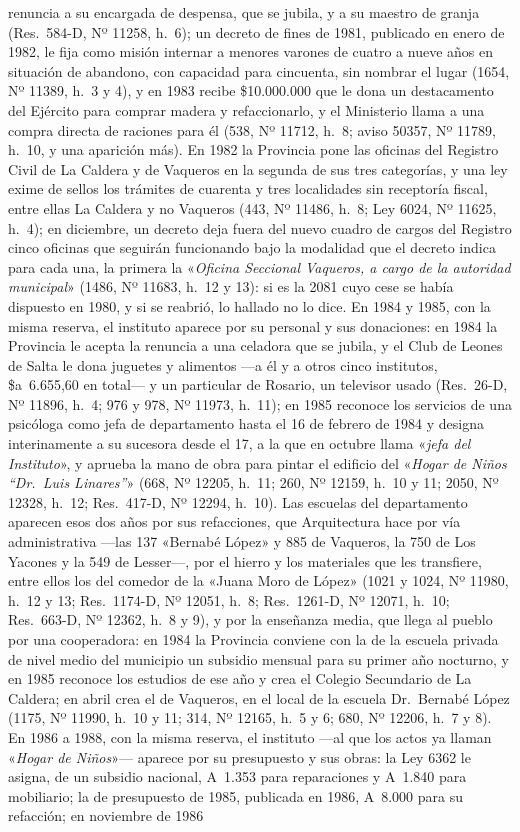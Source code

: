 renuncia a su encargada de despensa, que se jubila, y a su maestro de granja (Res.\ 584-D, Nº 11258, h.\ 6); un decreto de fines de 1981, publicado en enero de 1982, le fija como misión internar a menores varones de cuatro a nueve años en situación de abandono, con capacidad para cincuenta, sin nombrar el lugar (1654, Nº 11389, h.\ 3 y 4), y en 1983 recibe \$10.000.000 que le dona un destacamento del Ejército para comprar madera y refaccionarlo, y el Ministerio llama a una compra directa de raciones para él (538, Nº 11712, h.\ 8; aviso 50357, Nº 11789, h.\ 10, y una aparición más). En 1982 la Provincia pone las oficinas del Registro Civil de La Caldera y de Vaqueros en la segunda de sus tres categorías, y una ley exime de sellos los trámites de cuarenta y tres localidades sin receptoría fiscal, entre ellas La Caldera y no Vaqueros (443, Nº 11486, h.\ 8; Ley 6024, Nº 11625, h.\ 4); en diciembre, un decreto deja fuera del nuevo cuadro de cargos del Registro cinco oficinas que seguirán funcionando bajo la modalidad que el decreto indica para cada una, la primera la «\textit{Oficina Seccional Vaqueros, a cargo de la autoridad municipal}» (1486, Nº 11683, h.\ 12 y 13): si es la 2081 cuyo cese se había dispuesto en 1980, y si se reabrió, lo hallado no lo dice. En 1984 y 1985, con la misma reserva, el instituto aparece por su personal y sus donaciones: en 1984 la Provincia le acepta la renuncia a una celadora que se jubila, y el Club de Leones de Salta le dona juguetes y alimentos ---a él y a otros cinco institutos, \$a~6.655,60 en total--- y un particular de Rosario, un televisor usado (Res.\ 26-D, Nº 11896, h.\ 4; 976 y 978, Nº 11973, h.\ 11); en 1985 reconoce los servicios de una psicóloga como jefa de departamento hasta el 16 de febrero de 1984 y designa interinamente a su sucesora desde el 17, a la que en octubre llama «\textit{jefa del Instituto}», y aprueba la mano de obra para pintar el edificio del «\textit{Hogar de Niños ``Dr.\ Luis Linares''}» (668, Nº 12205, h.\ 11; 260, Nº 12159, h.\ 10 y 11; 2050, Nº 12328, h.\ 12; Res.\ 417-D, Nº 12294, h.\ 10). Las escuelas del departamento aparecen esos dos años por sus refacciones, que Arquitectura hace por vía administrativa ---las 137 «Bernabé López» y 885 de Vaqueros, la 750 de Los Yacones y la 549 de Lesser---, por el hierro y los materiales que les transfiere, entre ellos los del comedor de la «Juana Moro de López» (1021 y 1024, Nº 11980, h.\ 12 y 13; Res.\ 1174-D, Nº 12051, h.\ 8; Res.\ 1261-D, Nº 12071, h.\ 10; Res.\ 663-D, Nº 12362, h.\ 8 y 9), y por la enseñanza media, que llega al pueblo por una cooperadora: en 1984 la Provincia conviene con la de la escuela privada de nivel medio del municipio un subsidio mensual para su primer año nocturno, y en 1985 reconoce los estudios de ese año y crea el Colegio Secundario de La Caldera; en abril crea el de Vaqueros, en el local de la escuela Dr.\ Bernabé López (1175, Nº 11990, h.\ 10 y 11; 314, Nº 12165, h.\ 5 y 6; 680, Nº 12206, h.\ 7 y 8). En 1986 a 1988, con la misma reserva, el instituto ---al que los actos ya llaman «\textit{Hogar de Niños}»--- aparece por su presupuesto y sus obras: la Ley 6362 le asigna, de un subsidio nacional, A~1.353 para reparaciones y A~1.840 para mobiliario; la de presupuesto de 1985, publicada en 1986, A~8.000 para su refacción; en noviembre de 1986 
